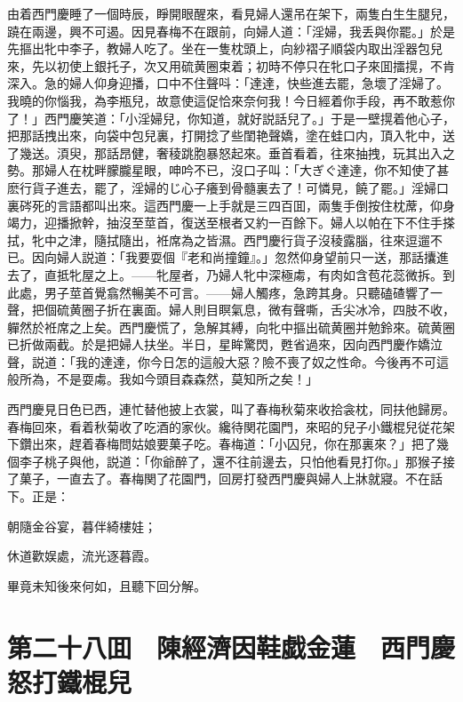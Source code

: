由着西門慶睡了一個時辰，睜開眼醒來，看見婦人還吊在架下，兩隻白生生腿兒，蹺在兩邊，興不可遏。因見春梅不在跟前，向婦人道：「淫婦，我丢與你罷。」於是先摳出牝中李子，教婦人吃了。坐在一隻枕頭上，向紗褶子順袋内取出淫器包兒來，先以初使上銀托子，次又用硫黄圈束着；初時不停只在牝口子來囬擂㨪，不肯深入。急的婦人仰身迎播，口中不住聲呌：「達達，快些進去罷，急壞了淫婦了。我曉的你惱我，為李瓶兒，故意使這促恰來奈何我！今日經着你手段，再不敢惹你了！」西門慶笑道：「小淫婦兒，你知道，就好説話兒了。」于是一壁㨪着他心子，把那話拽出來，向袋中包兒裏，打開捻了些閨艳聲嬌，塗在蛙口内，頂入牝中，送了幾送。湏臾，那話昂健，奢稜跳胞暴怒起來。垂首看着，往來抽拽，玩其出入之勢。那婦人在枕畔朦朧星眼，呻吟不已，沒口子叫：「大ぎぐ達達，你不知使了甚麽行貨子進去，罷了，淫婦的じ心子癢到骨髓裏去了！可憐見，饒了罷。」淫婦口裏硶死的言語都叫出來。這西門慶一上手就是三四百囬，兩隻手倒按住枕蓆，仰身竭力，迎播掀幹，抽沒至莖首，復送至根者又約一百餘下。婦人以帕在下不住手搽拭，牝中之津，隨拭隨出，袵席為之皆濕。西門慶行貨子沒稜露腦，往來逗遛不已。因向婦人説道：「我要耍個『老和尚撞鐘』。」忽然仰身望前只一送，那話攮進去了，直抵牝屋之上。——牝屋者，乃婦人牝中深極䖏，有肉如含苞花蕊微拆。到此處，男子莖首覺翕然暢美不可言。——婦人觸疼，急跨其身。只聽磕碴響了一聲，把個硫黄圈子折在裏面。婦人則目瞑氣息，微有聲嘶，舌尖冰冷，四肢不收，軃然於袵席之上矣。西門慶慌了，急解其縛，向牝中摳出硫黄圈并勉鈴來。硫黄圈已折做兩截。於是把婦人扶坐。半日，星眸驚閃，甦省過來，因向西門慶作嬌泣聲，説道：「我的達達，你今日怎的這般大惡？險不喪了奴之性命。今後再不可這般所為，不是耍䖏。我如今頭目森森然，莫知所之矣！」

西門慶見日色已西，連忙替他披上衣裳，叫了春梅秋菊來收拾衾枕，同扶他歸房。春梅回來，看着秋菊收了吃酒的家伙。纔待関花園門，來昭的兒子小鐵棍兒従花架下鑽出來，趕着春梅問姑娘要菓子吃。春梅道：「小囚兒，你在那裏來？」把了幾個李子桃子與他，説道：「你爺醉了，還不往前邊去，只怕他看見打你。」那猴子接了菓子，一直去了。春梅関了花園門，回房打發西門慶與婦人上牀就寢。不在話下。正是：

朝隨金谷宴，暮伴綺樓娃；

休道歡娱處，流光逐暮霞。

畢竟未知後來何如，且聽下回分解。

\chapter*{第二十八囬　陳經濟因鞋戯金蓮　西門慶怒打鐵棍兒}

